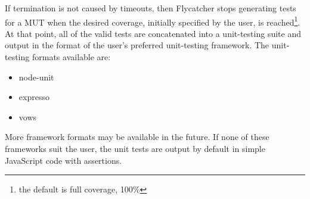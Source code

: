 If termination is not caused by timeouts, then \textsf{Flycatcher} stops generating tests for a MUT when the desired coverage, initially specified by the user, is reached\footnote{the default is full coverage, 100\%}. At that point, all of the valid tests are concatenated into a unit-testing suite and output in the format of the user's preferred unit-testing framework. The unit-testing formats available are:

\begin{itemize}
   \item node-unit
   \item expresso
   \item vows
\end{itemize}

More framework formats may be available in the future. If none of these frameworks suit the user, the unit tests are output by default in simple JavaScript code with assertions.